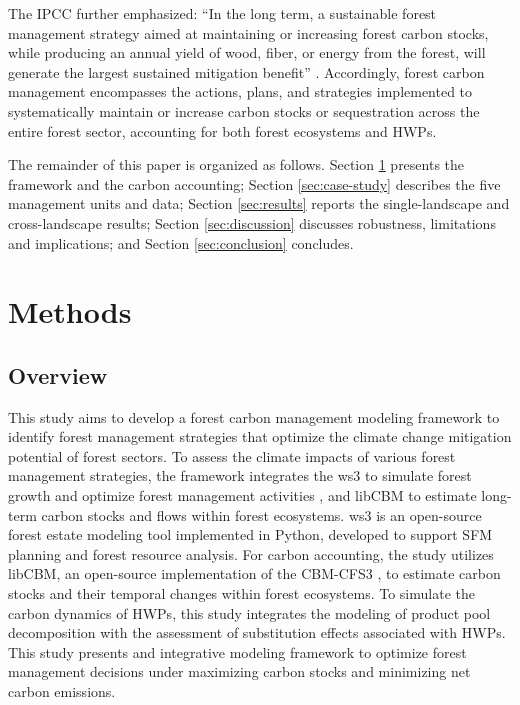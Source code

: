 \documentclass[preprint,12pt,authoryear]{elsarticle}
\begin{document}
\begin{linenumbers}
 The \ac{IPCC} further emphasized: “In the long term, a sustainable forest management strategy aimed at maintaining or increasing forest carbon stocks, while producing an annual yield of wood, fiber, or energy from the forest, will generate the largest sustained mitigation benefit” \citep{Nabuurs2007Forestry}. Accordingly, forest carbon management encompasses the actions, plans, and strategies implemented to systematically maintain or increase carbon stocks or sequestration across the entire forest sector, accounting for both forest ecosystems and \acp{HWP}.

The remainder of this paper is organized as follows. Section \ref{sec:methods} presents the framework and the carbon accounting; Section \ref{sec:case-study} describes the five management units and data; Section \ref{sec:results} reports the single-landscape and cross-landscape results; Section \ref{sec:discussion} discusses robustness, limitations and implications; and Section \ref{sec:conclusion} concludes.

\section{Methods}
\label{sec:methods}
\subsection{Overview}
\label{sec: overview} 
This study aims to develop a forest carbon management modeling framework to identify forest management strategies that optimize the climate change mitigation potential of forest sectors. To assess the climate impacts of various forest management strategies, the framework integrates the \ac{ws3} to simulate forest growth and optimize forest management activities \citep{Paradis_ws3_a_Wood_2025}, and libCBM \citep{libcbmpy} to estimate long-term carbon stocks and flows within forest ecosystems. \ac{ws3} is an open-source forest estate modeling tool implemented in Python, developed to support \ac{SFM} planning and forest resource analysis. For carbon accounting, the study utilizes libCBM, an open-source implementation of the \ac{CBM-CFS3} \citep{KURZ2009480}, to estimate carbon stocks and their temporal changes within forest ecosystems. To simulate the carbon dynamics of \acp{HWP}, this study integrates the modeling of product pool decomposition with the assessment of substitution effects associated with \acp{HWP}. This study presents and integrative modeling framework to optimize forest management decisions under maximizing carbon stocks and minimizing net carbon emissions.  


\end{linenumbers}
\end{document}
